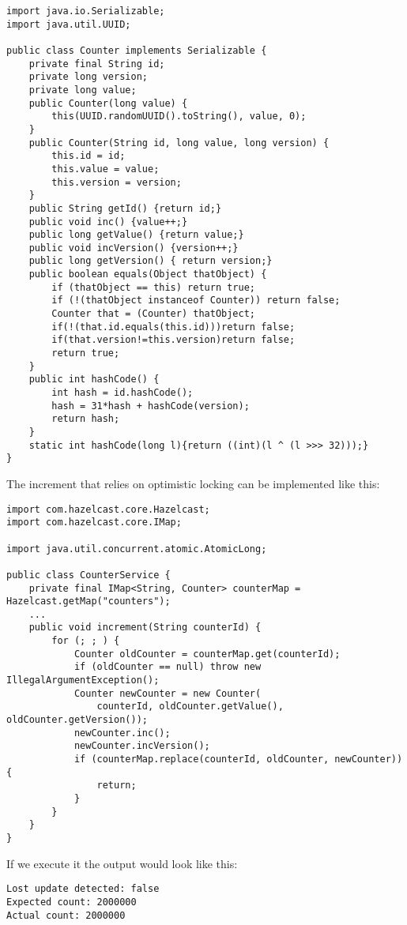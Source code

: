 \begin{verbatim}
import java.io.Serializable;
import java.util.UUID;

public class Counter implements Serializable {
    private final String id;
    private long version;
    private long value;
    public Counter(long value) {
        this(UUID.randomUUID().toString(), value, 0);
    }
    public Counter(String id, long value, long version) {
        this.id = id;
        this.value = value;
        this.version = version;
    }
    public String getId() {return id;}
    public void inc() {value++;}
    public long getValue() {return value;}
    public void incVersion() {version++;}
    public long getVersion() { return version;}
    public boolean equals(Object thatObject) {
        if (thatObject == this) return true;
        if (!(thatObject instanceof Counter)) return false;
        Counter that = (Counter) thatObject;
        if(!(that.id.equals(this.id)))return false;
        if(that.version!=this.version)return false;
        return true;
    }
    public int hashCode() {
        int hash = id.hashCode();
        hash = 31*hash + hashCode(version);
        return hash;
    }
    static int hashCode(long l){return ((int)(l ^ (l >>> 32)));}
}
\end{verbatim}

The increment that relies on optimistic locking can be implemented like this:

\begin{verbatim}
import com.hazelcast.core.Hazelcast;
import com.hazelcast.core.IMap;

import java.util.concurrent.atomic.AtomicLong;

public class CounterService {
    private final IMap<String, Counter> counterMap = Hazelcast.getMap("counters");
    ...
    public void increment(String counterId) {
        for (; ; ) {
            Counter oldCounter = counterMap.get(counterId);
            if (oldCounter == null) throw new IllegalArgumentException();
            Counter newCounter = new Counter(
                counterId, oldCounter.getValue(), oldCounter.getVersion());
            newCounter.inc();
            newCounter.incVersion();
            if (counterMap.replace(counterId, oldCounter, newCounter)) {
                return;
            } 
        }
    }
}
\end{verbatim}

If we execute it the output would look like this:

\begin{verbatim}
Lost update detected: false
Expected count: 2000000
Actual count: 2000000
\end{verbatim}

